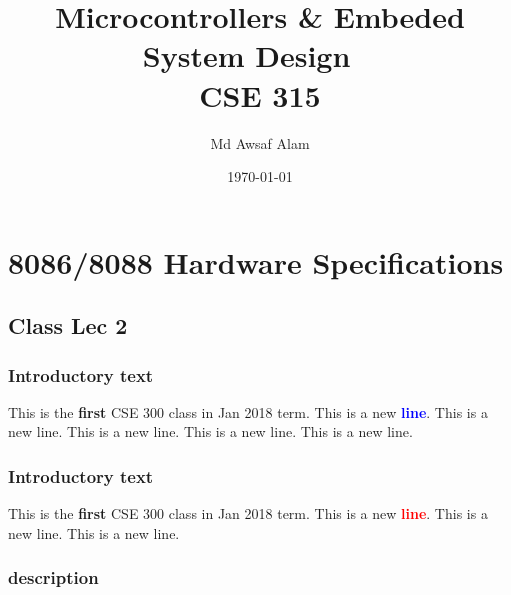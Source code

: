 \documentclass{book}
\title{Microcontrollers \& Embeded System Design ~\textbf{\\CSE 315}}
\author{Md Awsaf Alam}
\date{\today}
\begin{document}
\maketitle
\newpage

\tableofcontents

\chapter{8086/8088 Hardware Specifications}

\section{Class Lec 2}

\subsection{Introductory text}
This is the \textbf{first} CSE 300 class in Jan 2018 term.
This is a new \textcolor{blue}{\textbf{line}}.
This is a new line.
This is a new line.
This is a new line.
This is a new line.


\subsection{Introductory text}
\label{sec:intro_text}
This is the \textbf{first} CSE 300 class in Jan 2018 term.
This is a new \textcolor{red}{\textbf{line}}.
This is a new line.
This is a new line.

\subsection{description}
\end{document}
